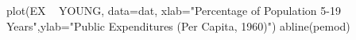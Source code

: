 \begin{Schunk}
\begin{Sinput}
 plot(EX  ~  YOUNG, data=dat, xlab="Percentage of Population 5-19 Years",ylab="Public Expenditures (Per Capita, 1960)")
 abline(pemod)
\end{Sinput}
\end{Schunk}
